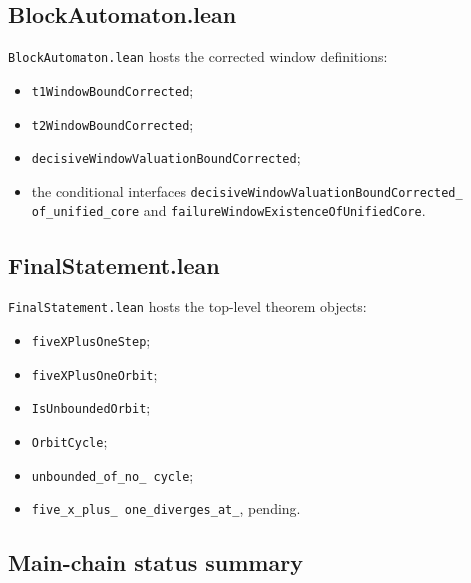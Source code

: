 \subsection{BlockAutomaton.lean}

\texttt{BlockAutomaton.lean} hosts the corrected window definitions:
\begin{itemize}[leftmargin=*]
\item \texttt{t1WindowBoundCorrected};
\item \texttt{t2WindowBoundCorrected};
\item \texttt{decisiveWindowValuationBoundCorrected};
\item the conditional interfaces
  \texttt{decisiveWindowValuationBoundCorrected\_\allowbreak
  of\_\allowbreak unified\_\allowbreak core} and
  \texttt{failureWindowExistenceOfUnifiedCore}.
\end{itemize}

\subsection{FinalStatement.lean}

\texttt{FinalStatement.lean} hosts the top-level theorem objects:
\begin{itemize}[leftmargin=*]
\item \texttt{fiveXPlusOneStep};
\item \texttt{fiveXPlusOneOrbit};
\item \texttt{IsUnboundedOrbit};
\item \texttt{OrbitCycle};
\item \texttt{unbounded\_\allowbreak of\_\allowbreak no\_\allowbreak
  cycle};
\item \texttt{five\_\allowbreak x\_\allowbreak plus\_\allowbreak
  one\_\allowbreak diverges\_\allowbreak at\_}, pending.
\end{itemize}

\subsection{Main-chain status summary}

